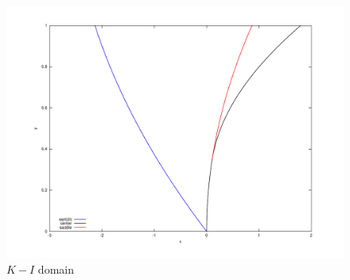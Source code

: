 \begin{figure}
\begin{center}
\includegraphics[width=\textwidth*7/8,angle=0]{figures/HIdomain}
\caption{$K-I$ domain}
\label{f:HI domain}
\end{center}
\end{figure}


